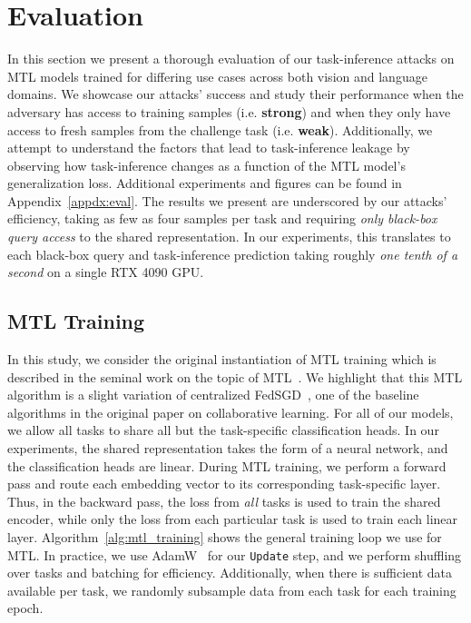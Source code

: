 \section{Evaluation} \label{sec:eval}

In this section we present a thorough evaluation of our task-inference attacks on MTL models trained for differing use cases across both vision and language domains. We showcase our attacks' success and study their performance when the adversary has access to training samples (i.e. \textbf{strong}) and when they only have access to fresh samples from the challenge task (i.e. \textbf{weak}). Additionally, we attempt to understand the factors that lead to task-inference leakage by observing how task-inference changes as a function of the MTL model's generalization loss. Additional experiments and figures can be found in Appendix~\ref{appdx:eval}. The results we present are underscored by our attacks' efficiency, taking as few as four samples per task and requiring \emph{only black-box query access} to the shared representation. In our experiments, this translates to each black-box query and task-inference prediction taking roughly \emph{one tenth of a second} on a single RTX 4090 GPU.

\subsection{MTL Training} 
In this study, we consider the original instantiation of MTL training which is described in the seminal work on the topic of MTL~\cite{caruana-1997-multitask}. We highlight that this MTL algorithm is a slight variation of centralized FedSGD~\cite{mcmahan2017FLoriginal}, one of the baseline algorithms in the original paper on collaborative learning. For all of our models, we allow all tasks to share all but the task-specific classification heads. In our experiments, the shared representation takes the form of a neural network, and the classification heads are linear. During MTL training, we perform a forward pass and route each embedding vector to its corresponding task-specific layer. Thus, in the backward pass, the loss from \textit{all} tasks is used to train the shared encoder, while only the loss from each particular task is used to train each linear layer. Algorithm~\ref{alg:mtl_training} shows the general training loop we use for MTL. In practice, we use AdamW~\cite{loshchilov-2017-adamw} for our \texttt{Update} step, and we perform shuffling over tasks and batching for efficiency. Additionally, when there is sufficient data available per task, we randomly subsample data from each task for each training epoch. 

